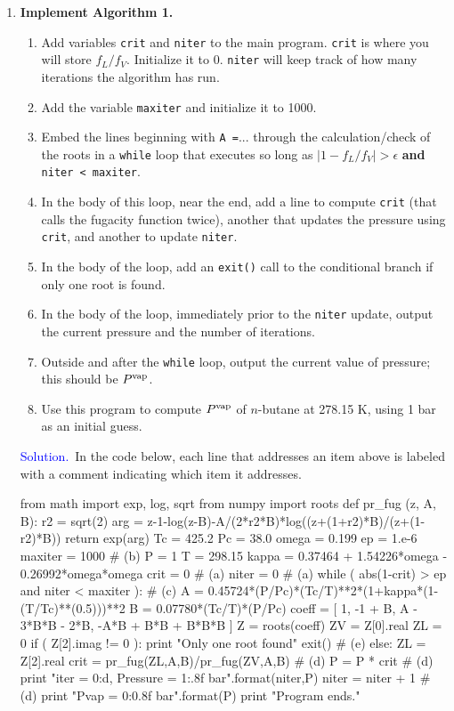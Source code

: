 \documentclass[11pt]{article}
\newif \ifshowsolutions
\begin{document}
\begin{enumerate}
\item {\bf Implement Algorithm 1.}  
\begin{enumerate}
\item Add variables {\tt crit} and {\tt niter} to the main program.  {\tt crit} is where you will store $f_L/f_V$.  Initialize it to 0.  {\tt niter} will keep track of how many iterations the algorithm has run.  
\item Add the variable {\tt maxiter} and initialize it to 1000.  
\item Embed the lines beginning with {\tt A =}... through the calculation/check of the roots in a {\tt while} loop that executes so long as $\left|1-f_L/f_V\right|>\epsilon$ {\bf and} {\tt niter < maxiter}.  
\item In the body of this loop, near the end, add a line to compute {\tt crit} (that calls the fugacity function twice), another that updates the pressure using {\tt crit}, and another to update {\tt niter}.
\item In the body of the loop, add an {\tt exit()} call to the conditional branch if only one root is found.
\item In the body of the loop, immediately prior to the {\tt niter} update, output the current pressure and the number of iterations.
\item Outside and after the {\tt while} loop, output the current value of pressure; this should be $P^{\rm vap}$.
\item Use this program to compute $P^{\rm vap}$ of $n$-butane at 278.15 K, using 1 bar as an initial guess.
\end{enumerate}

\ifshowsolutions
\textcolor{blue}{Solution.}\ In the code below, each line that addresses an item above is labeled with a comment indicating which item it addresses.
\begin{python}
from math import exp, log, sqrt
from numpy import roots
def pr_fug (z, A, B):
   r2 = sqrt(2)
   arg = z-1-log(z-B)-A/(2*r2*B)*log((z+(1+r2)*B)/(z+(1-r2)*B))
   return exp(arg)
Tc = 425.2
Pc = 38.0
omega = 0.199
ep = 1.e-6
maxiter = 1000 # (b)
P = 1
T = 298.15
kappa = 0.37464 + 1.54226*omega - 0.26992*omega*omega
crit = 0 # (a)
niter = 0 # (a)
while ( abs(1-crit) > ep and niter < maxiter ):  # (c)
   A = 0.45724*(P/Pc)*(Tc/T)**2*(1+kappa*(1-(T/Tc)**(0.5)))**2
   B = 0.07780*(Tc/T)*(P/Pc)
   coeff = [ 1, -1 + B, A - 3*B*B - 2*B, -A*B + B*B + B*B*B ]
   Z = roots(coeff)
   ZV = Z[0].real
   ZL = 0
   if ( Z[2].imag != 0 ):
      print "Only one root found"
      exit() # (e)
   else:
      ZL = Z[2].real
   crit = pr_fug(ZL,A,B)/pr_fug(ZV,A,B) # (d)
   P = P * crit # (d)
   print "iter = {0:d}, Pressure = {1:.8f} bar".format(niter,P)
   niter = niter + 1  # (d)
print "Pvap = {0:0.8f} bar".format(P)
print "Program ends."
\end{python}


\end{enumerate}
\end{document}

